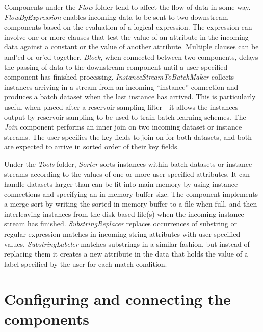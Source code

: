Components under the \textit{Flow} folder tend to affect the flow of
data in some way. \textit{FlowByExpression} enables incoming data to
be sent to two downstream components based on the evaluation of a
logical expression. The expression can involve one or more clauses
that test the value of an attribute in the incoming data against a
constant or the value of another attribute. Multiple clauses can be
and'ed or or'ed together. \textit{Block}, when connected between two
components, delays the passing of data to the downstream component
until a user-specified component has finished
processing. \textit{InstanceStreamToBatchMaker} collects instances
arriving in a stream from an incoming ``instance'' connection and
produces a batch dataset when the last instance has arrived. This is
particularly useful when placed after a reservoir sampling filter---it
allows the instances output by reservoir sampling to be used to train
batch learning schemes. The {\em Join} component performs an inner join on
two incoming dataset or instance streams. The user specifies the key
fields to join on for both datasets, and both are expected to arrive
in sorted order of their key fields.

Under the \textit{Tools} folder, \textit{Sorter} sorts instances
within batch datasets or instance streams according to the values of
one or more user-specified attributes. It can handle datasets larger
than can be fit into main memory by using instance connections and
specifying an in-memory buffer size. The component implements a merge
sort by writing the sorted in-memory buffer to a file when full, and
then interleaving instances from the disk-based file(s) when the
incoming instance stream has finished. \textit{SubstringReplacer}
replaces occurrences of substring or regular expression matches in
incoming string attributes with user-specified
values. \textit{SubstringLabeler} matches substrings in a similar
fashion, but instead of replacing them it creates a new attribute in
the data that holds the value of a label specified by the user for
each match condition.

\section{Configuring and connecting the components}

